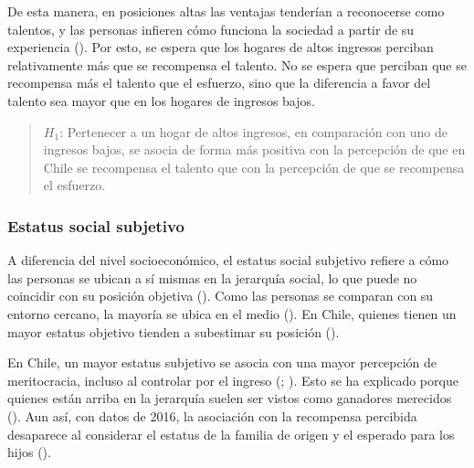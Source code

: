 \documentclass[
  spanish,
  a4paper,
  oneside]{scrbook}
\begin{document}
De esta manera, en posiciones altas las ventajas tenderían a reconocerse
como talentos, y las personas infieren cómo funciona la sociedad a
partir de su experiencia (). Por esto, se espera que los hogares de altos ingresos perciban
relativamente más que se recompensa el talento. No se espera que
perciban que se recompensa más el talento que el esfuerzo, sino que la
diferencia a favor del talento sea mayor que en los hogares de ingresos
bajos.

\begin{quote}
\(H_1\): Pertenecer a un hogar de altos ingresos, en comparación con uno
de ingresos bajos, se asocia de forma más positiva con la percepción de
que en Chile se recompensa el talento que con la percepción de que se
recompensa el esfuerzo.
\end{quote}

\subsubsection{Estatus social
subjetivo}\label{estatus-social-subjetivo-1}

A diferencia del nivel socioeconómico, el estatus social subjetivo
refiere a cómo las personas se ubican a sí mismas en la jerarquía
social, lo que puede no coincidir con su posición objetiva
(). Como las
personas se comparan con su entorno cercano, la mayoría se ubica en el
medio (). En
Chile, quienes tienen un mayor estatus objetivo tienden a subestimar su
posición ().

En Chile, un mayor estatus subjetivo se asocia con una mayor percepción
de meritocracia, incluso al controlar por el ingreso
(; ). Esto se ha explicado porque quienes están arriba en la jerarquía
suelen ser vistos como ganadores merecidos
(). Aun así, con datos de 2016, la asociación con la
recompensa percibida desaparece al considerar el estatus de la familia
de origen y el esperado para los hijos
().
\end{document}
